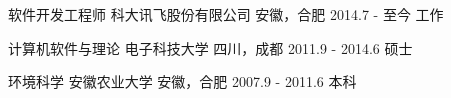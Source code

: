 

\begin{cventries}

  \cveduentry
    {软件开发工程师} %
    {科大讯飞股份有限公司} %
    {安徽，合肥} %
    {2014.7 - 至今} %
    {工作}

  \cveduentry
    {计算机软件与理论} %
    {电子科技大学} %
    {四川，成都} %
    {2011.9 - 2014.6} %
    {硕士}

  \cveduentry
    {环境科学} %
    {安徽农业大学} %
    {安徽，合肥} %
    {2007.9 - 2011.6} %
    {本科}

\end{cventries}
